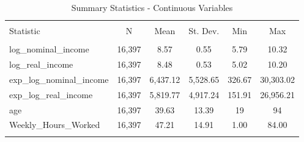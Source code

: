 
\begin{table}[!htbp] \centering 
  \caption{Summary Statistics - Continuous Variables} 
  \label{} 
\begin{tabular}{@{\extracolsep{5pt}}lccccc} 
\\[-1.8ex]\hline 
\hline \\[-1.8ex] 
Statistic & \multicolumn{1}{c}{N} & \multicolumn{1}{c}{Mean} & \multicolumn{1}{c}{St. Dev.} & \multicolumn{1}{c}{Min} & \multicolumn{1}{c}{Max} \\ 
\hline \\[-1.8ex] 
log\_nominal\_income & 16,397 & 8.57 & 0.55 & 5.79 & 10.32 \\ 
log\_real\_income & 16,397 & 8.48 & 0.53 & 5.02 & 10.20 \\ 
exp\_log\_nominal\_income & 16,397 & 6,437.12 & 5,528.65 & 326.67 & 30,303.02 \\ 
exp\_log\_real\_income & 16,397 & 5,819.77 & 4,917.24 & 151.91 & 26,956.21 \\ 
age & 16,397 & 39.63 & 13.39 & 19 & 94 \\ 
Weekly\_Hours\_Worked & 16,397 & 47.21 & 14.91 & 1.00 & 84.00 \\ 
\hline \\[-1.8ex] 
\end{tabular} 
\end{table} 
